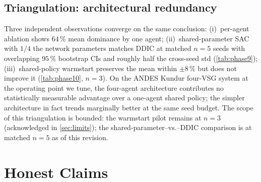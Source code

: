 \documentclass[journal,onecolumn,11pt]{IEEEtran}
\begin{document}
\subsection{Triangulation: architectural redundancy}

Three independent observations converge on the same conclusion:
(i)~per-agent ablation shows $64\,\%$ mean dominance by one agent;
(ii)~shared-parameter SAC with $1/4$ the network parameters matches
DDIC at matched $n = 5$ seeds with overlapping $95\,\%$ bootstrap
CIs and roughly half the cross-seed std (\cref{tab:phase9});
(iii)~shared-policy warmstart preserves the mean within $\pm 8\,\%$
but does not improve it (\cref{tab:phase10}, $n = 3$). On the ANDES
Kundur four-VSG system at the operating point we tune, the four-agent
architecture contributes no statistically measurable advantage over
a one-agent shared policy; the simpler architecture in fact trends
marginally better at the same seed budget. The scope of this
triangulation is bounded: the warmstart pilot remains at $n = 3$
(acknowledged in \cref{sec:limits}); the shared-parameter--vs.--DDIC
comparison is at matched $n = 5$ as of this revision.

\section{Honest Claims}\label{sec:claims}
\end{document}
